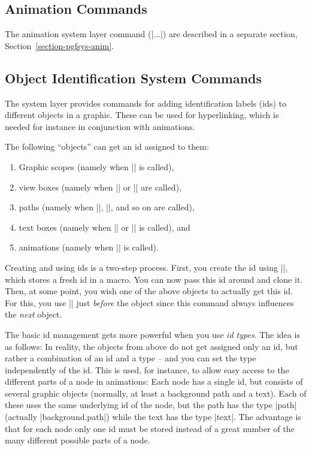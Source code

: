\subsection{Animation Commands}

The animation system layer command (|\pgfsys@anim...|) are described in a
separate section, Section~\ref{section-pgfsys-anim}.


\subsection{Object Identification System Commands}
\label{section-sys-id}

The system layer provides commands for adding identification labels (ids) to
different objects in a graphic. These can be used for hyperlinking, which is
needed for instance in conjunction with animations.

The following ``objects'' can get an id assigned to them:
%
\begin{enumerate}
    \item Graphic scopes (namely when |\pgfsys@begin@idscope| is called),
    \item view boxes (namely when |\pgfsys@viewboxmeet| or
        |\pgfsys@viewboxslice| are called),
    \item paths (namely when |\pgfsys@fill|, |\pgfsys@stroke|, and so on are
        called),
    \item text boxes (namely when |\pgfsys@hbox| or |\pgfsys@hboxsynced| is
        called), and
    \item animations (namely when |\pgfsys@animate| is called).
\end{enumerate}

Creating and using ids is a two-step process. First, you create the id using
|\pgfsys@new@id|, which stores a fresh id in a macro. You can now pass this id
around and clone it. Then, at some point, you wish one of the above objects to
actually get this id. For this, you use |\pgfsys@use@id| just \emph{before} the
object since this command always influences the \emph{next} object.

The basic id management gets more powerful when you use \emph{id types}. The
idea is as follows: In reality, the objects from above do not get assigned only
an id, but rather a combination of an id and a type -- and you can set the type
independently of the id. This is used, for instance, to allow easy access to
the different parts of a node in animations: Each node has a single id, but
consists of several graphic objects (normally, at least a background path and a
text). Each of these uses the same underlying id of the node, but the path has
the type |path| (actually |background.path|) while the text has the type
|text|. The advantage is that for each node only one id must be stored instead
of a great number of the many different possible parts of a node.

